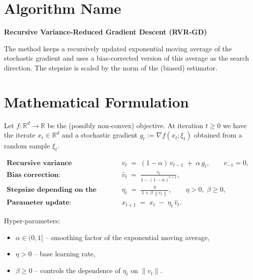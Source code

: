 \documentclass{article}
\newcommand{\norm}[1]{\left\lVert#1\right\rVert}
\begin{document}
\section*{Algorithm Name}
\textbf{Recursive Variance‑Reduced Gradient Descent (RVR‑GD)}  

The method keeps a recursively updated exponential moving average of the stochastic gradient and uses a bias‑corrected version of this average as the search direction. The stepsize is scaled by the norm of the (biased) estimator.

\section*{Mathematical Formulation}
Let $f:\mathbb{R}^d\rightarrow\mathbb{R}$ be the (possibly non‑convex) objective. At iteration $t\ge 0$ we have the iterate $x_t\in\mathbb{R}^d$ and a stochastic gradient $g_t:=\nabla f(x_t;\xi_t)$ obtained from a random sample $\xi_t$.  

\[
\begin{aligned}
\textbf{Recursive variance estimator:}&\qquad 
v_t \;=\;(1-\alpha)\,v_{t-1} \;+\; \alpha\, g_t ,\qquad v_{-1}=0, \tag{1}\\[4pt]
\textbf{Bias correction:}&\qquad 
\hat v_t \;=\; \frac{v_t}{1-(1-\alpha)^{t+1}} ,\tag{2}\\[4pt]
\textbf{Stepsize depending on the estimator:}&\qquad 
\eta_t \;=\; \frac{\eta}{\,1+\beta \,\norm{v_t}\,},\qquad \eta>0,\;\beta\ge 0,\tag{3}\\[4pt]
\textbf{Parameter update:}&\qquad 
x_{t+1}\;=\;x_t \;-\; \eta_t \,\hat v_t .\tag{4}
\end{aligned}
\]

Hyper‑parameters:
\begin{itemize}[noitemsep]
  \item $\alpha\in(0,1]$ – smoothing factor of the exponential moving average,
  \item $\eta>0$ – base learning rate,
  \item $\beta\ge 0$ – controls the dependence of $\eta_t$ on $\|v_t\|$.
\end{itemize}
\end{document}
